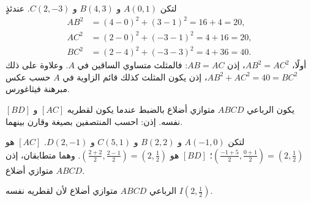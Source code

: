 \begin{example}\label{ex:g10:coordgeom:triangle}
لتكن $A(0, 1)$ و $B(4, 3)$ و $C(2, -3)$. عندئذٍ
\begin{align*}
AB^2 &= (4-0)^2 + (3-1)^2 = 16 + 4 = 20, \\
AC^2 &= (2-0)^2 + (-3-1)^2 = 4 + 16 = 20, \\
BC^2 &= (2-4)^2 + (-3-3)^2 = 4 + 36 = 40 .
\end{align*}
أولًا، $AB^2 = AC^2$، إذن $AB = AC$: فالمثلث متساوي الساقين في $A$.
وعلاوة على ذلك $AB^2 + AC^2 = 40 = BC^2$، إذن يكون المثلث كذلك قائم الزاوية في $A$
حسب عكس مبرهنة فيثاغورس.
\end{example}

\begin{method}\label{met:g10:coordgeom:parallelogram}
يكون الرباعي $ABCD$ متوازي أضلاع بالضبط عندما يكون لقطريه
$[AC]$ و $[BD]$  نفسه. إذن: احسب المنتصفين بصيغة
 وقارن بينهما.
\end{method}

\begin{example}\label{ex:g10:coordgeom:parallelogram}
لتكن $A(-1, 0)$ و $B(2, 2)$ و $C(5, 1)$ و $D(2, -1)$. 
$[AC]$ هو $\left(\frac{-1+5}{2}, \frac{0+1}{2}\right) = (2, \frac12)$؛ 
$[BD]$ هو $\left(\frac{2+2}{2}, \frac{2-1}{2}\right) =
(2, \frac12)$. وهما متطابقان، إذن $ABCD$ متوازي أضلاع.
\end{example}

\begin{omfigure}

{\small الرباعي $ABCD$ متوازي أضلاع لأن لقطريه 
نفسه $I(2, \frac12)$.}
\end{omfigure}

